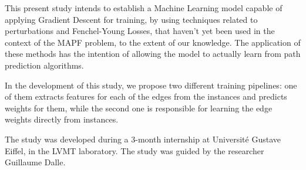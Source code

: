 This present study intends to establish a Machine Learning model capable of applying Gradient Descent for training, by using techniques related to perturbations and Fenchel-Young Losses, that haven't yet been used in the context of the MAPF problem, to the extent of our knowledge. The application of these methods has the intention of allowing the model to actually learn from path prediction algorithms.

In the development of this study, we propose two different training pipelines: one of them extracts features for each of the edges from the instances and predicts weights for them, while the second one is responsible for learning the edge weights directly from instances.

The study was developed during a 3-month internship at Université Gustave Eiffel, in the LVMT laboratory. The study was guided by the researcher Guillaume Dalle.